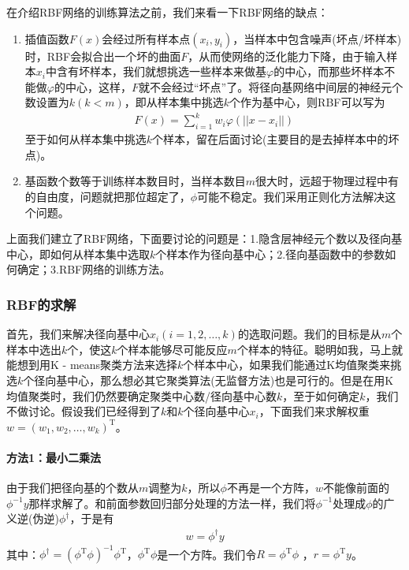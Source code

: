             \par
            在介绍RBF网络的训练算法之前，我们来看一下RBF网络的缺点：
            \begin{enumerate}
            \item 插值函数$F(x)$会经过所有样本点$(x_i,y_i)$，当样本中包含噪声(坏点/坏样本)时，RBF会拟合出一个坏的曲面$F$，从而使网络的泛化能力下降，由于输入样本$x_i$中含有坏样本，我们就想挑选一些样本来做基$\varphi$的中心，而那些坏样本不能做$\varphi$的中心，这样，$F$就不会经过“坏点”了。将径向基网络中间层的神经元个数设置为$k(k<m)$，即从样本集中挑选$k$个作为基中心，则RBF可以写为
            \begin{align*}
            F(x) = \sum_{i=1}^k w_i \varphi(||x-x_i||)
            \end{align*}
            至于如何从样本集中挑选$k$个样本，留在后面讨论(主要目的是去掉样本中的坏点)。
            \item 基函数个数等于训练样本数目时，当样本数目$m$很大时，远超于物理过程中有的自由度，问题就把那位超定了，$\phi$可能不稳定。我们采用正则化方法解决这个问题。
            \end{enumerate}
            \par
            上面我们建立了RBF网络，下面要讨论的问题是：1.隐含层神经元个数以及径向基中心，即如何从样本集中选取$k$个样本作为径向基中心；2.径向基函数中的参数如何确定；3.RBF网络的训练方法。
        \subsubsection{RBF的求解}
            \par
            首先，我们来解决径向基中心$x_i(i = 1,2,\dots,k)$的选取问题。我们的目标是从$m$个样本中选出$k$个，使这$k$个样本能够尽可能反应$m$个样本的特征。聪明如我，马上就能想到用K - means聚类方法来选择$k$个样本中心，如果我们能通过K均值聚类来挑选$k$个径向基中心，那么想必其它聚类算法(无监督方法)也是可行的。但是在用K均值聚类时，我们仍然要确定聚类中心数/径向基中心数$k$，至于如何确定$k$，我们不做讨论。假设我们已经得到了$k$和$k$个径向基中心$x_i$，下面我们来求解权重$w = (w_1,w_2,\dots,w_k)^\mathrm{T}$。
            \paragraph{方法1：最小二乘法}由于我们把径向基的个数从$m$调整为$k$，所以$\phi$不再是一个方阵，$w$不能像前面的$\phi^{-1}y$那样求解了。和前面参数回归部分处理的方法一样，我们将$\phi^{-1}$处理成$\phi$的广义逆(伪逆)$\phi^\dag$，于是有
            \begin{align*}
            w= \phi^\dag y
            \end{align*}
            其中：$\phi^\dag = (\phi^\mathrm{T}\phi)^{-1}\phi^\mathrm{T}$，$\phi^\mathrm{T}\phi$是一个方阵。我们令$R = \phi^\mathrm{T}\phi$ ，$r= \phi^\mathrm{T}y$。
